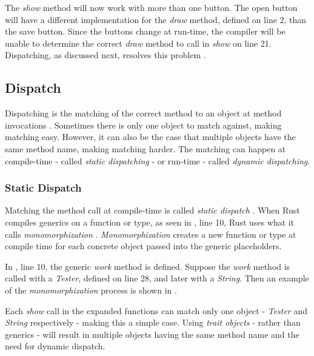 The \textit{show} method will now work with more than one button.
The open button will have a different implementation for the \textit{draw} method, defined on line 2, than the save button.
Since the buttons change at run-time, the compiler will be unable to determine the correct \textit{draw} method to call in \textit{show} on line 21.
Dispatching, as discussed next, resolves this problem \cite{pierce_02_01}.

\subsection{Dispatch}
Dispatching is the matching of the correct method to an object at method invocations \cite{driesen_95_01}.
Sometimes there is only one object to match against, making matching easy.
However, it can also be the case that multiple objects have the same method name, making matching harder.
The matching can happen at compile-time - called \textit{static dispatching} - or run-time - called \textit{dynamic dispatching}.

\subsubsection{Static Dispatch}
Matching the method call at compile-time is called \textit{static dispatch} \cite{klabnik_2019_01, alexandrescu_01_01, abadi_12_01}.
When Rust compiles generics on a function or type, as seen in , line 10, Rust uses what it calls \textit{monomorphization} \cite{klabnik_2019_01}.
\textit{Monomorphization} creates a new function or type at compile time for each concrete object passed into the generic placeholders.

In , line 10, the generic \textit{work} method is defined.
Suppose the \textit{work} method is called with a \textit{Tester}, defined on line 28, and later with a \textit{String}.
Then an example of the \textit{monomorphization} process is shown in .


Each \textit{show} call in the expanded functions can match only one object - \textit{Tester} and \textit{String} respectively - making this a simple case.
Using \textit{trait objects} - rather than generics - will result in multiple objects having the same method name and the need for dynamic dispatch.

